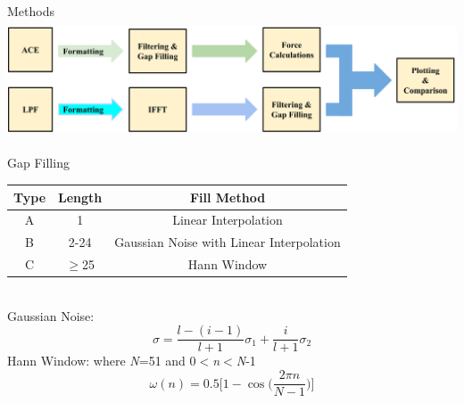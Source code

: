 \documentclass[aspectratio=169,xcolor=dvipsnames]{beamer}
\begin{document}
\begin{frame}{Methods}
\centering
    \includegraphics[height=3.5cm, width=14.5cm]{fig1solWmam.jpg}
\end{frame}
\begin{frame}{Gap Filling}
    \begin{table}[htbp]

    \begin{center}
    \renewcommand{\arraystretch}{1.5}
    \begin{tabular}{|c|c|c|}
    \hline
    Type & Length & Fill Method\\
    \hline
    A & 1 & Linear Interpolation\\
    \hline
    B & 2-24 & Gaussian Noise with Linear Interpolation\\
    \hline
    C & $\geq$25 & Hann Window\\
    \hline
    
    \end{tabular}
    \label{tab1}
    \end{center}
    \end{table}\\
Gaussian Noise: 
\begin{equation}\label{eq:Gaussian Window Equations}
\sigma=\frac{l-(i-1)}{l+1}\sigma_{1}+\frac{i}{l+1}\sigma_{2}
\end{equation}
Hann Window:
where \textit{N}=51 and 0$<$\textit{n}$<$\textit{N}-1
\begin{equation}\label{eq:Hanning Window}
\omega(n)=0.5\biggr[1-\cos{\biggl(\frac{2\pi n}{N-1}\biggl)}\biggr]
\end{equation}\\
\end{frame}
\end{document}
